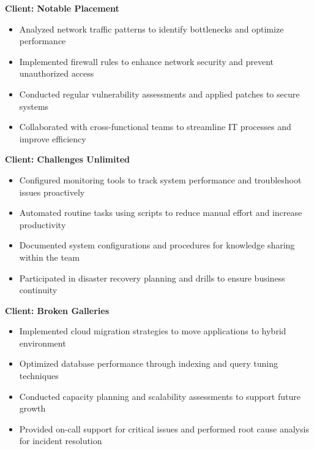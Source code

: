 

\textbf{\color{darkblue}Client: Notable Placement}
\begin{itemize}
    \item Analyzed network traffic patterns to identify bottlenecks and optimize performance
    \item Implemented firewall rules to enhance network security and prevent unauthorized access
    \item Conducted regular vulnerability assessments and applied patches to secure systems
    \item Collaborated with cross-functional teams to streamline IT processes and improve efficiency
\end{itemize}

\textbf{\color{darkblue}Client: Challenges Unlimited}
\begin{itemize}
    \item Configured monitoring tools to track system performance and troubleshoot issues proactively
    \item Automated routine tasks using scripts to reduce manual effort and increase productivity
    \item Documented system configurations and procedures for knowledge sharing within the team
    \item Participated in disaster recovery planning and drills to ensure business continuity
\end{itemize}

\textbf{\color{darkblue}Client: Broken Galleries}
\begin{itemize}
    \item Implemented cloud migration strategies to move applications to hybrid environment
    \item Optimized database performance through indexing and query tuning techniques
    \item Conducted capacity planning and scalability assessments to support future growth
    \item Provided on-call support for critical issues and performed root cause analysis for incident resolution
\end{itemize}

\vspace{8pt}


